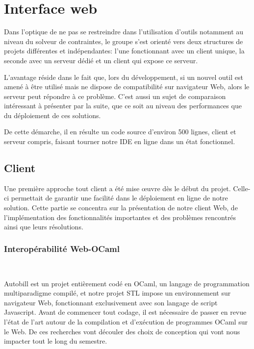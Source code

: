 \documentclass[12pt]{article}
\begin{document}
\newpage

\hypertarget{interface-web}{%
      \section{Interface web}\label{interface-web}}

Dans l'optique de ne pas se restreindre dans l'utilisation d'outils
notamment au niveau du solveur de contraintes, le groupe s'est orienté
vers deux structures de projets différentes et indépendantes: l'une
fonctionnant avec un client unique, la seconde avec un serveur dédié et
un client qui expose ce serveur.

L'avantage réside dans le fait que, lors du développement, si un nouvel
outil est amené à être utilisé mais ne dispose de compatibilité sur
navigateur Web, alors le serveur peut répondre à ce problème. C'est
aussi un sujet de comparaison intéressant à présenter par la suite, que
ce soit au niveau des performances que du déploiement de ces solutions.

De cette démarche, il en résulte un code source d'environ 500 lignes,
client et serveur compris, faisant tourner notre IDE en ligne dans un
état fonctionnel.

\subsection{Client}

Une première approche tout client a été mise œuvre dès le début du
projet. Celle-ci permettait de garantir une facilité dans le déploiement
en ligne de notre solution. Cette partie se concentra sur la présentation de
notre client Web, de l'implémentation des fonctionnalités importantes et des problèmes rencontrés ainsi que leurs résolutions.

\subsubsection{Interopérabilité Web-OCaml}\

Autobill est un projet entièrement codé en OCaml, un langage de programmation multiparadigme compilé, et notre projet STL impose un environnement sur navigateur Web, fonctionnant exclusivement avec son langage de script Javascript. Avant de commencer tout codage, il est nécessaire de passer en revue l'état de l'art autour de la compilation et d'exécution de programmes OCaml sur le Web. De ces recherches vont découler  des choix de conception qui vont nous impacter tout le long du semestre. \\
\end{document}
